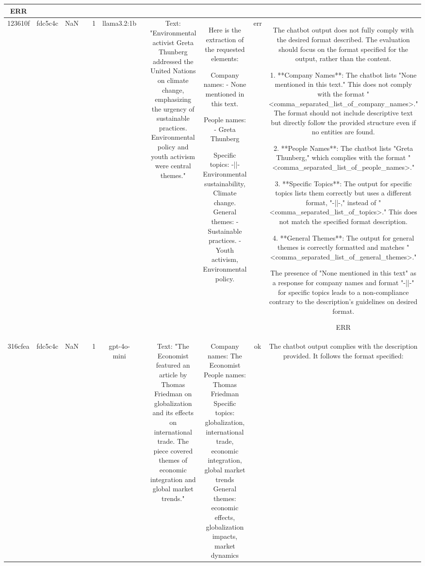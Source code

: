 \begin{table}[h!]
\begin{tabular}{|c|c|c|c|c|c|c|c|c|c|c|}
ERR\\
\hline
123610f & fdc5c4c & NaN &  & 1 & llama3.2:1b &  & Text: "Environmental activist Greta Thunberg addressed the United Nations on climate change, emphasizing the urgency of sustainable practices. Environmental policy and youth activism were central themes." & Here is the extraction of the requested elements:

Company names: 
- None mentioned in this text.

People names:
- Greta Thunberg 

Specific topics: -||-
Environmental sustainability, Climate change.
General themes: 
- Sustainable practices.
- Youth activism, Environmental policy. & err & The chatbot output does not fully comply with the desired format described. The evaluation should focus on the format specified for the output, rather than the content.

1. **Company Names**: The chatbot lists "None mentioned in this text." This does not comply with the format "<comma_separated_list_of_company_names>." The format should not include descriptive text but directly follow the provided structure even if no entities are found.

2. **People Names**: The chatbot lists "Greta Thunberg," which complies with the format "<comma_separated_list_of_people_names>."

3. **Specific Topics**: The output for specific topics lists them correctly but uses a different format, "-||-," instead of "<comma_separated_list_of_topics>." This does not match the specified format description.

4. **General Themes**: The output for general themes is correctly formatted and matches "<comma_separated_list_of_general_themes>."

The presence of "None mentioned in this text" as a response for company names and format "-||-" for specific topics leads to a non-compliance contrary to the description's guidelines on desired format.

ERR\\
\hline
316cfea & fdc5c4c & NaN &  & 1 & gpt-4o-mini &  & Text: "The Economist featured an article by Thomas Friedman on globalization and its effects on international trade. The piece covered themes of economic integration and global market trends." & Company names: The Economist  
People names: Thomas Friedman  
Specific topics: globalization, international trade, economic integration, global market trends  
General themes: economic effects, globalization impacts, market dynamics   & ok & The chatbot output complies with the description provided. It follows the format specified: 


\end{tabular}
\end{table}
